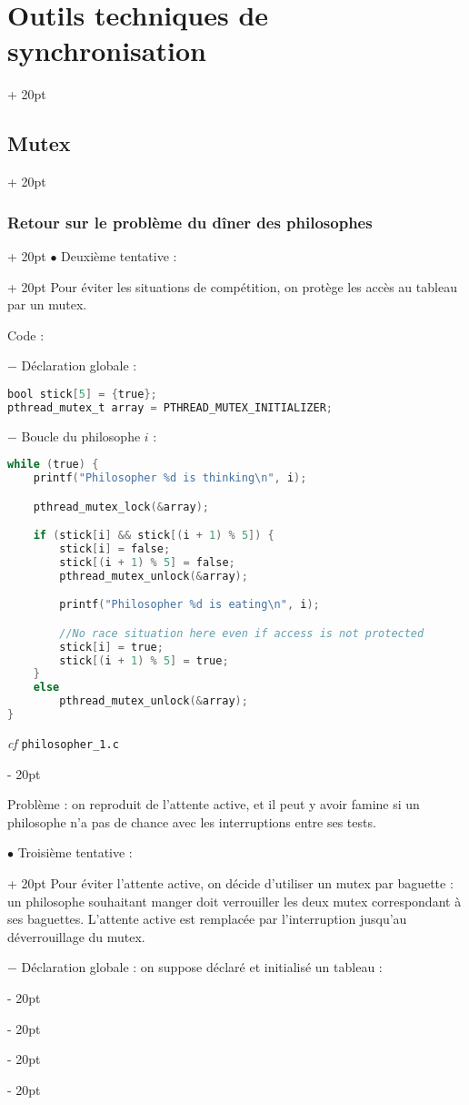 \documentclass[a4paper, 12pt, twoside]{article}
\newcommand{\ind}[1][20pt]{\advance\leftskip + #1}
\newcommand{\deind}[1][20pt]{\advance\leftskip - #1}
\newenvironment{indt}[2][20pt]{#2 \par \ind[#1]}{\par \deind} %
\begin{document}
\begin{indt}{\section{Outils techniques de synchronisation}}
\begin{indt}{\subsection{Mutex}}
\begin{indt}{\subsubsection{Retour sur le problème du dîner des philosophes}}
\begin{indt}{$\bullet$ Deuxième tentative :}
                    Pour éviter les situations de compétition, on protège les accès au tableau par un mutex.

                    Code :

                    $-$ Déclaration globale :

                    \begin{lstlisting}[language=C, xleftmargin=100pt]
bool stick[5] = {true};
pthread_mutex_t array = PTHREAD_MUTEX_INITIALIZER;\end{lstlisting}

                    $-$ Boucle du philosophe $i$ :

                    \begin{lstlisting}[language=C, xleftmargin=100pt]
while (true) {
    printf("Philosopher %d is thinking\n", i);

    pthread_mutex_lock(&array);

    if (stick[i] && stick[(i + 1) % 5]) {
        stick[i] = false;
        stick[(i + 1) % 5] = false;
        pthread_mutex_unlock(&array);

        printf("Philosopher %d is eating\n", i);

        //No race situation here even if access is not protected
        stick[i] = true; 
        stick[(i + 1) % 5] = true;
    }
    else
        pthread_mutex_unlock(&array);
}\end{lstlisting}

                    \textit{cf} \texttt{philosopher\_1.c}
                \end{indt}

                \vspace{12pt}
                
                Problème : on reproduit de l'attente active, et il peut y avoir famine si un philosophe n'a pas de chance avec les interruptions entre ses tests.

                \vspace{12pt}
                
                \begin{indt}{$\bullet$ Troisième tentative :}
                    Pour éviter l'attente active, on décide d'utiliser un mutex par baguette : un philosophe souhaitant manger doit verrouiller les deux mutex correspondant à ses baguettes.
                    L'attente active est remplacée par l'interruption jusqu'au déverrouillage du mutex.

                    $-$ Déclaration globale : on suppose déclaré et initialisé un tableau :


\end{indt}
\end{indt}
\end{indt}
\end{indt}
\end{document}
